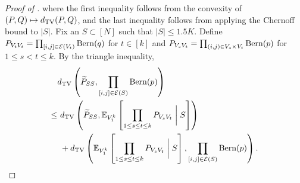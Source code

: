 \begin{proof}[Proof of ]
where the first inequality follows from the convexity of $(P,Q) \mapsto d_{\rm TV} (P,Q)$, and the last inequality follows from applying the Chernoff bound to $|S|$.
Fix an $S \subset [N]$ such that $|S| \le 1.5 K$. Define $P_{V_tV_t}=\prod_{[i,j] \in {\mathcal{E}}(V_t)} {\rm Bern}(q)$ for $t \in [k]$ and
$P_{V_sV_t}= \prod_{(i,j) \in V_s \times V_t} {\rm Bern}(p)$ for $1 \le s<t \le k$.
By the triangle inequality,
\begin{align}
& d_{\rm TV} \left( {\widetilde{P}}_{SS},
\prod_{[i,j] \in {\mathcal{E}}(S)} {\rm Bern}(p)   \right) \nonumber \\
\le & ~d_{\rm TV} \left( {\widetilde{P}}_{SS},  \mathbb{E}_{V_1^k } \left [  \prod_{1 \le s \le t\le k} P_{V_sV_t} \biggm \vert S \right]\right) \label{eq:TotalVarTriangle1} \\
& ~+d_{\rm TV}  \left( \mathbb{E}_{V_1^k} \left [  \prod_{1 \le s \le t\le k} P_{V_sV_t} \biggm \vert S \right], \prod_{[i,j] \in {\mathcal{E}}(S)} {\rm Bern}(p) \right). \label{eq:TotalVarTriangle2}
\end{align}


\end{proof}
